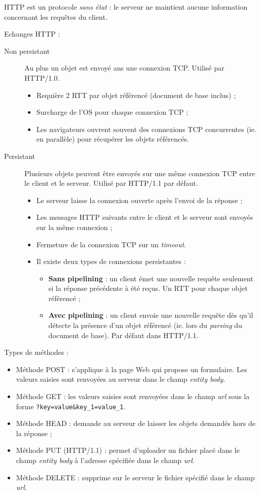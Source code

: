 \documentclass[11pt,english,french]{scrreprt}
\theoremstyle{remark}
\theoremstyle{definition}
\begin{document}
HTTP est un protocole \emph{sans état} : le serveur ne maintient aucune information concernant les requêtes du client. 

Echanges HTTP :\begin{description}
	\item[Non persistant] Au plus un objet est envoyé ans une connexion TCP. Utilisé par HTTP/1.0.\begin{itemize}
		\item Requière 2 RTT par objet référencé (document de base inclus) ;
		\item Surcharge de l'OS pour chaque connexion TCP ;
		\item Les navigateurs ouvrent souvent des connexions TCP concurrentes (ie. en parallèle) pour récupérer les objets référencés.
	\end{itemize}
	\item[Persistant] Plusieurs objets peuvent être envoyés sur une même connexion TCP entre le client et le serveur. Utilisé par HTTP/1.1 par défaut. \begin{itemize}
		\item Le serveur laisse la connexion ouverte après l'envoi de la réponse ;
		\item Les messages HTTP suivants entre le client et le serveur sont envoyés sur la même connexion ;
		\item Fermeture de la connexion TCP sur un \emph{timeout}.
		\item Il existe deux types de connexions persistantes : \begin{itemize}
			\item \textbf{Sans pipelining} : un client émet une nouvelle requête seulement si la réponse précédente à été reçus. Un RTT pour chaque objet référencé ;
			\item \textbf{Avec pipelining} : un client envoie une nouvelle requête dès qu'il détecte la présence d'un objet référencé (ie. lors du \emph{parsing} du document de base). Par défaut dans HTTP/1.1.
		\end{itemize}
	\end{itemize}
\end{description}

Types de méthodes :\begin{itemize}
	\item Méthode POST : s'applique à la page Web qui propose un formulaire. Les valeurs saisies sont renvoyées au serveur dans le champ \emph{entity body}.
	\item Méthode GET : les valeurs saisies sont renvoyées dans le champ \emph{url} sous la forme \lstinline!?key=value&key_1=value_1!.
	\item Méthode HEAD : demande au serveur de laisser les objets demandés hors de la réponse ;
	\item Méthode PUT (HTTP/1.1) : permet d'uploader un fichier placé dans le champ \emph{entity body} à l'adresse spécifiée dans le champ \emph{url}.
	\item Méthode DELETE : supprime sur le serveur le fichier spécifié dans le champ \emph{url}.
\end{itemize}
\end{document}
